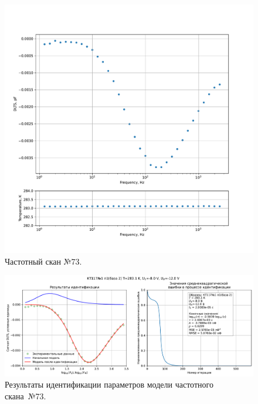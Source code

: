 \begin{figure}[!ht]
    \centering
    \includegraphics[width=1\textwidth]{../plots/КТ117№1_п1(база 2)_2500Гц-1Гц_1пФ_+10С_-8В-12В_100мВ_20мкс_шаг_0,1.pdf}
    \caption{Частотный скан №73.}
    \label{pic:frequency_scan_73}
\end{figure}

\begin{figure}[!ht]
    \centering
    \includegraphics[width=1\textwidth]{../plots/КТ117№1_п1(база 2)_2500Гц-1Гц_1пФ_+10С_-8В-12В_100мВ_20мкс_шаг_0,1_model.pdf}
    \caption{Результаты идентификации параметров модели частотного скана~№73.}
    \label{pic:frequency_scan_model73}
\end{figure}

\pagebreak



